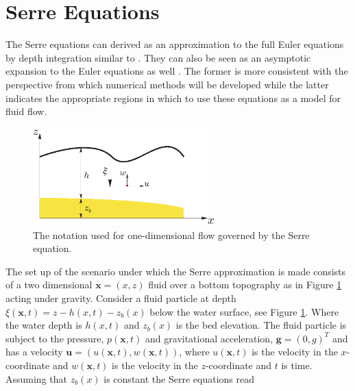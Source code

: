 \documentclass[SingleSpace,12pt,Proceedings]{Serre_ASCE}
\begin{document}
\section{Serre Equations}
\label{section:Serre Equations}
The Serre equations can derived as an approximation to the full Euler equations by depth integration similar to \cite{Su-Gardener-1969-536}. They can also be seen as an asymptotic expansion to the Euler equations as well \cite{Bonneton-Lannes-2009-16601}. The former is more consistent with the perspective from which numerical methods will be developed while the latter indicates the appropriate regions in which to use these equations as a model for fluid flow.
\begin{figure}[htb]
\begin{center}
\includegraphics[width=7.0cm]{one-dimensional-axis_Serre.eps}
\end{center}
\caption{The notation used for one-dimensional flow governed by the Serre equation.}
\label{fig:Notation}
\end{figure}
The set up of the scenario under which the Serre approximation is made consists of a two dimensional $\textbf{x} = (x,z)$ fluid over a bottom topography as in Figure \ref{fig:Notation} acting under gravity. Consider a fluid particle at depth  $\xi(\textbf{x},t) = z - h(x,t) - z_b(x)$ below the water surface, see Figure \ref{fig:Notation}. Where the water depth is $h(x,t)$ and $z_b(x)$ is the bed elevation. The fluid particle is subject to the pressure, $p(\textbf{x},t)$ and  gravitational acceleration, $\textbf{g} = (0,g)^T$ and has a velocity $\textbf{u} = (u(\textbf{x},t),w(\textbf{x},t))$,  where $u(\textbf{x},t)$ is the velocity in the $x$-coordinate and $w(\textbf{x},t)$ is the velocity in the $z$-coordinate and $t$ is time. Assuming that $z_b(x)$ is constant the Serre equations read \cite{Guyenne-etal-2014-169}
\end{document}
